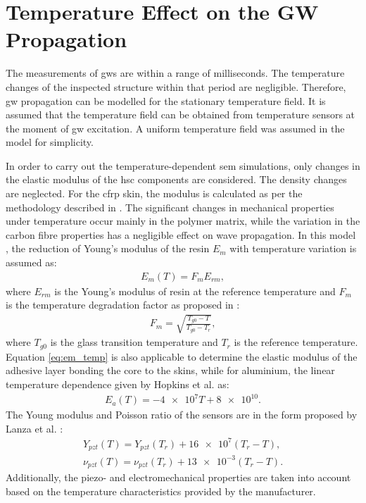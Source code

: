\section{Temperature Effect on the GW Propagation}
\label{sec:temp}


The measurements of \acp{gw} are within a range of milliseconds.
The temperature changes of the inspected structure within that period are negligible.
Therefore, \ac{gw} propagation can be modelled for the stationary temperature field.
It is assumed that the temperature field can be obtained from temperature sensors at the moment of \ac{gw} excitation.
A uniform temperature field was assumed in the model for simplicity.

In order to carry out the temperature-dependent \ac{sem} simulations, only changes in the elastic modulus of the \ac{hsc} components are considered.
The density changes are neglected. For the \ac{cfrp} skin, the modulus is calculated as per the methodology described in \cite{chamis1983simplified,salamone2009guided}.
The significant changes in mechanical properties under temperature occur mainly in the polymer matrix, while the variation in the carbon fibre properties has a negligible effect on wave propagation.
In this model \cite{salamone2009guided,hopkins2012extreme}, the reduction of Young’s modulus of the resin \(E_m\) with temperature variation is assumed as:
\begin{eqnarray}
	E_m(T)=F_m E_{rm},
	\label{eq:factor_temp}
\end{eqnarray}
where \(E_{rm}\) is the Young’s modulus of resin at the reference temperature and \(F_m\) is the temperature degradation factor as proposed in \cite{chamis1983simplified}:
\begin{eqnarray}
F_m=\sqrt{\frac{T_{g0}-T}{T_{g0}-T_r}},
\label{eq:em_temp}
\end{eqnarray}
where \(T_{g0}\) is the glass transition temperature and \(T_r\) is the reference temperature.
Equation \ref{eq:em_temp} is also applicable to determine the elastic modulus of the adhesive layer bonding the core to the skins, while for aluminium, the linear temperature dependence given by Hopkins et al. \cite{hopkins2012extreme} as:
\begin{eqnarray}
	E_a(T)=-\num{4e7}T+\num{8e10}.
	\label{eq:aluminium_temp}
\end{eqnarray}
The Young modulus and Poisson ratio of the sensors are in the form proposed by Lanza et al. \cite{lanza2008temperature}:
\begin{eqnarray}
	Y_{pzt}(T)=Y_{pzt}(T_r) + \num{16e7}(T_r-T),\\
	\nu_{pzt}(T)=\nu_{pzt}(T_r) + \num{13e-3}(T_r-T).
	\label{eq:pzt_temp}
\end{eqnarray}
Additionally, the piezo- and electromechanical properties are taken into account based on the temperature characteristics provided by the manufacturer.
